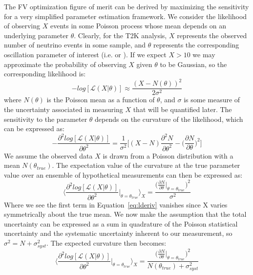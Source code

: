 The FV optimization figure of merit can be derived by maximizing the
sensitivity for a very simplified parameter estimation framework. We
consider the likelihood of observing $X$ events in some Poisson process whose
mean depends on an underlying parameter $\theta$. Clearly, for the T2K
analysis, $X$ represents the observed number of neutrino events in some sample,
and $\theta$ represents the corresponding oscillation parameter of interest
(i.e. \thdis or \dcp).  If we expect $X>10$ we may approximate the probability
of observing $X$ given $\theta$ to be Gaussian, so the corresponding likelihood
is:
%
\begin{equation}
  -log[\mathcal{L}(X|\theta)] \approx \frac{(X - N(\theta))^{2}}{2\sigma^{2}}
\end{equation}
%
where $N(\theta)$ is the Poisson mean as a function of $\theta$, and $\sigma$
is some measure of the uncertainty associated in measuring $X$ that will be
quantified later. The sensitivity to the parameter  $\theta$ depends on the
curvature of the likelihood, which can be expressed as:
%
\begin{equation}
\label{eq:lderiv}
  -\frac{\partial^{2}  log[\mathcal{L}(X|\theta)]}{\partial \theta^{2}} =
  \frac{1}{\sigma^{2}}\bigg[(X - N)\frac{\partial^{2} N}{\partial \theta^{2}} - \bigg(\frac{\partial N}{\partial \theta}\bigg)^{2} \bigg]
\end{equation}
%
We assume the observed data $X$ is drawn from a Poisson distribution with a
mean $N(\theta_{true})$.  The expectation value of the curvature at the true
parameter value over an ensemble of hypothetical measurements can then be
expressed as:
%
\begin{equation}
  \bigg\langle \frac{\partial^{2} log[\mathcal{L}(X|\theta)]}{\partial \theta^{2}} \Big|_{\theta = \theta_{true}}  \bigg\rangle_{X} = 
  \frac{\big( \frac{\partial N}{\partial \theta}|_{\theta = \theta_{true}}\big)^{2}}{\sigma^{2}}
\end{equation}
%
Where we see the first term in Equation~\ref{eq:lderiv} vanishes since X varies
symmetrically about the true mean.  We now make the assumption that the total
uncertainty can be expressed as a sum in quadrature of the Poisson statistical
uncertainty and the systematic uncertainty inherent to our measurement, so
$\sigma^{2} = N + \sigma^{2}_{syst}$.  The expected curvature then becomes:
%
\begin{equation}
   \bigg\langle \frac{\partial^{2} log[\mathcal{L}(X|\theta)]}{\partial \theta^{2}} \Big|_{\theta = \theta_{true}}  \bigg\rangle_{X} = 
   \frac{\big( \frac{\partial N}{\partial \theta}|_{\theta = \theta_{true}}\big)^{2}}{N(\theta_{true}) + \sigma_{syst}^{2}}
\end{equation}
